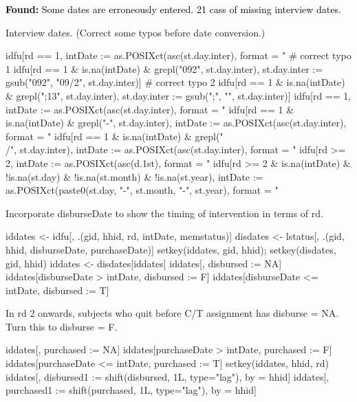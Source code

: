 \textcolor{black}{\textbf{Found:} Some dates are erroneously entered. 21 cass of missing interview dates. }

Interview dates. (Correct some typos before date conversion.)
\begin{Schunk}
\begin{Sinput}
idfu[rd == 1, intDate := as.POSIXct(asc(st.day.inter), format = "%d-%m-%Y")]
# correct typo 1
idfu[rd == 1 & is.na(intDate) & grepl("092", st.day.inter), 
	st.day.inter := gsub("092", "09/2", st.day.inter)]
# correct typo 2
idfu[rd == 1 & is.na(intDate) & grepl(";13", st.day.inter), 
	st.day.inter := gsub(";", "", st.day.inter)]
idfu[rd == 1, intDate := as.POSIXct(asc(st.day.inter), format = "%d-%m-%Y")]
idfu[rd == 1 & is.na(intDate) & grepl("-", st.day.inter), 
	intDate := as.POSIXct(asc(st.day.inter), format = "%d-%m-%y")]
idfu[rd == 1 & is.na(intDate) & grepl("\\/", st.day.inter), 
	intDate := as.POSIXct(asc(st.day.inter), format = "%d/%m/%Y")]
idfu[rd >= 2, intDate := as.POSIXct(asc(d.1st), format = "%d%m%y")]
idfu[rd >= 2 & is.na(intDate) & !is.na(st.day) & !is.na(st.month) & !is.na(st.year), 
	intDate := as.POSIXct(paste0(st.day, "-", st.month, "-", st.year), format = "%d-%m-%y")]
\end{Sinput}
\end{Schunk}
Incorporate \textsf{disburseDate} to show the timing of intervention in terms of rd.
\begin{Schunk}
\begin{Sinput}
iddates <- idfu[, .(gid, hhid, rd, intDate, memstatus)]
disdates <- lstatus[, .(gid, hhid, disburseDate, purchaseDate)]
setkey(iddates, gid, hhid); setkey(disdates, gid, hhid)
iddates <- disdates[iddates]
iddates[, disbursed := NA]
iddates[disburseDate > intDate, disbursed := F]
iddates[disburseDate <= intDate, disbursed := T]
\end{Sinput}
\end{Schunk}
In rd 2 onwards, subjects who quit before C/T assignment has disburse = NA. Turn this to disburse = F.
\begin{Schunk}
\begin{Sinput}
iddates[, purchased := NA]
iddates[purchaseDate > intDate, purchased := F]
iddates[purchaseDate <= intDate, purchased := T]
setkey(iddates, hhid, rd)
iddates[, disbursed1 := shift(disbursed, 1L, type="lag"), by = hhid]
iddates[, purchased1 := shift(purchased, 1L, type="lag"), by = hhid]
\end{Sinput}
\end{Schunk}
